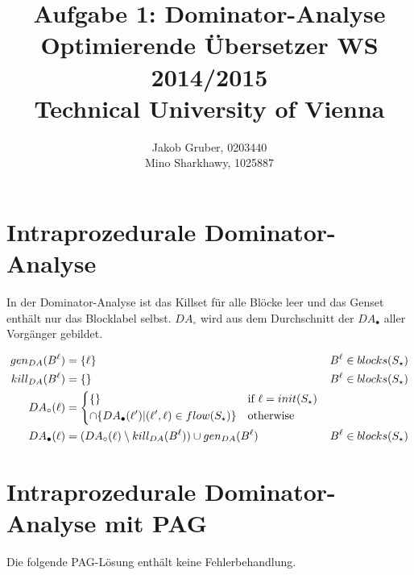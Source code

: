\documentclass[a4paper,10pt]{article}
\title{Aufgabe 1: Dominator-Analyse \\
       Optimierende Übersetzer WS 2014/2015 \\
       Technical University of Vienna}
\author{Jakob Gruber, 0203440 \\
        Mino Sharkhawy, 1025887}
\begin{document}
\maketitle

\section{Intraprozedurale Dominator-Analyse}

In der Dominator-Analyse ist das Killset für alle Blöcke leer und das Genset enthält
nur das Blocklabel selbst. $DA_{\circ}$ wird aus dem Durchschnitt der $DA_{\bullet}$
aller Vorgänger gebildet.

\begin{align*}
        gen_{DA}(B^\ell) &= \{\ell\} & B^\ell \in blocks(S_\star) \\
        kill_{DA}(B^\ell) &= \{\} & B^\ell \in blocks(S_\star) \\
        DA_{\circ}(\ell) &=
        \begin{dcases}
                \{\} & \text{if } \ell = init(S_\star) \\
                \cap \{DA_\bullet(\ell') | (\ell', \ell) \in flow(S_\star)\} &
                \text{otherwise}\\
        \end{dcases}\\
        DA_{\bullet}(\ell) &= (DA_{\circ}(\ell) \setminus kill_{DA}(B^\ell)) \cup
        gen_{DA}(B^\ell) & B^\ell \in blocks(S_\star)
\end{align*}

\section{Intraprozedurale Dominator-Analyse mit PAG}

Die folgende PAG-Lösung enthält keine Fehlerbehandlung.


\end{document}
